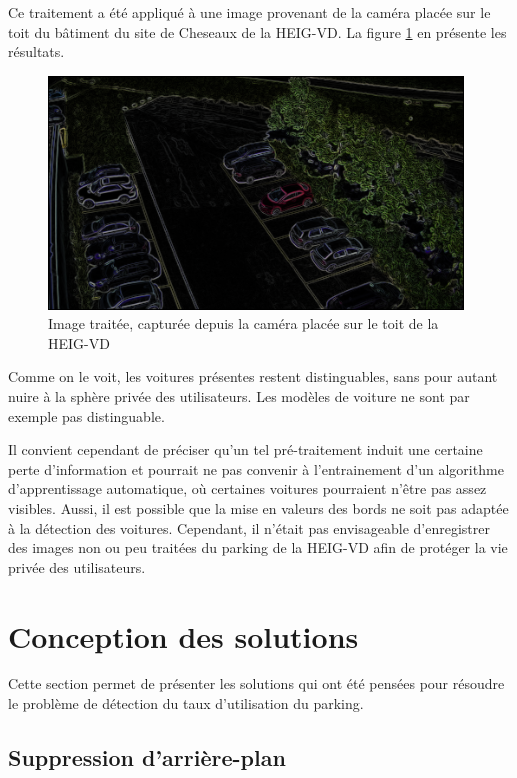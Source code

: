 Ce traitement a été appliqué à une image provenant de la caméra placée sur le toit du bâtiment du site de Cheseaux de la HEIG-VD. La figure \ref{fig:process_heig_example} en présente les résultats.

\begin{figure}[H]
    \includegraphics[width=110mm]{img/conception/image_process/heig_example.png}
    \centering
    \caption{Image traitée, capturée depuis la caméra placée sur le toit de la HEIG-VD}
    \label{fig:process_heig_example}
\end{figure}

Comme on le voit, les voitures présentes restent distinguables, sans pour autant nuire à la sphère privée des utilisateurs. Les modèles de voiture ne sont par exemple pas distinguable.

Il convient cependant de préciser qu'un tel pré-traitement induit une certaine perte d'information et pourrait ne pas convenir à l'entrainement d'un algorithme d'apprentissage automatique, où certaines voitures pourraient n'être pas assez visibles. Aussi, il est possible que la mise en valeurs des bords ne soit pas adaptée à la détection des voitures. Cependant, il n'était pas envisageable d'enregistrer des images non ou peu traitées du parking de la HEIG-VD afin de protéger la vie privée des utilisateurs.

\section{Conception des solutions}

Cette section permet de présenter les solutions qui ont été pensées pour résoudre le problème de détection du taux d'utilisation du parking. 


\subsection{Suppression d'arrière-plan}

